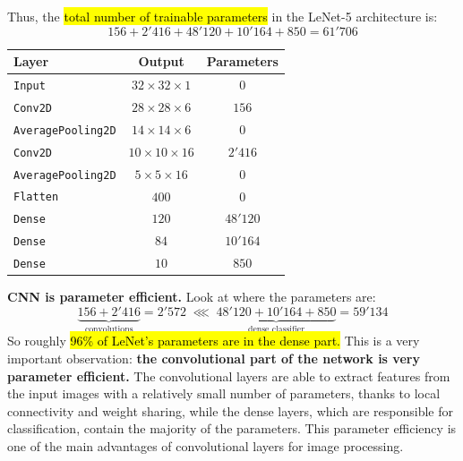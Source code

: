 Thus, the \hl{total number of trainable parameters} in the LeNet-5 architecture is:
\begin{equation*}
    156 + 2'416 + 48'120 + 10'164 + 850 = 61'706
\end{equation*}

\begin{table}[!htp]
    \centering
    \begin{tabular}{@{} l c c @{}}
        \toprule
        \textbf{Layer} & \textbf{Output} & \textbf{Parameters} \\
        \midrule
        \texttt{Input} & $32 \times 32 \times 1$ & $0$ \\
        \texttt{Conv2D} & $28 \times 28 \times 6$ & $156$ \\
        \texttt{AveragePooling2D} & $14 \times 14 \times 6$ & $0$ \\
        \texttt{Conv2D} & $10 \times 10 \times 16$ & $2'416$ \\
        \texttt{AveragePooling2D} & $5 \times 5 \times 16$ & $0$ \\
        \texttt{Flatten} & $400$ & $0$ \\
        \texttt{Dense} & $120$ & $48'120$ \\
        \texttt{Dense} & $84$ & $10'164$ \\
        \texttt{Dense} & $10$ & $850$ \\
        \bottomrule
    \end{tabular}
\end{table}

\noindent
\textcolor{Green3}{ \textbf{CNN is parameter efficient.}} Look at where the parameters are:
\begin{equation*}
    \underbrace{156 + 2'416}_{\text{convolutions}} = 2'572 \; \lll \; \underbrace{48'120 + 10'164 + 850}_{\text{dense classifier}} = 59'134
\end{equation*}
So roughly \hl{96\% of LeNet's parameters are in the dense part.} This is a very important observation: \textbf{the convolutional part of the network is very parameter efficient.} The convolutional layers are able to extract features from the input images with a relatively small number of parameters, thanks to local connectivity and weight sharing, while the dense layers, which are responsible for classification, contain the majority of the parameters. This parameter efficiency is one of the main advantages of convolutional layers for image processing.
